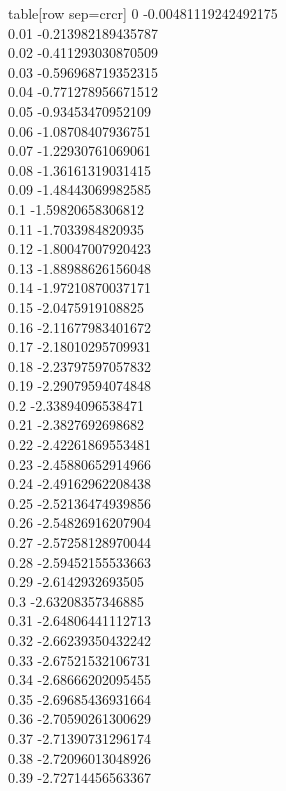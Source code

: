   table[row sep=crcr]{%
0	-0.00481119242492175\\
0.01	-0.213982189435787\\
0.02	-0.411293030870509\\
0.03	-0.596968719352315\\
0.04	-0.771278956671512\\
0.05	-0.93453470952109\\
0.06	-1.08708407936751\\
0.07	-1.22930761069061\\
0.08	-1.36161319031415\\
0.09	-1.48443069982585\\
0.1	-1.59820658306812\\
0.11	-1.7033984820935\\
0.12	-1.80047007920423\\
0.13	-1.88988626156048\\
0.14	-1.97210870037171\\
0.15	-2.0475919108825\\
0.16	-2.11677983401672\\
0.17	-2.18010295709931\\
0.18	-2.23797597057832\\
0.19	-2.29079594074848\\
0.2	-2.33894096538471\\
0.21	-2.3827692698682\\
0.22	-2.42261869553481\\
0.23	-2.45880652914966\\
0.24	-2.49162962208438\\
0.25	-2.52136474939856\\
0.26	-2.54826916207904\\
0.27	-2.57258128970044\\
0.28	-2.59452155533663\\
0.29	-2.6142932693505\\
0.3	-2.63208357346885\\
0.31	-2.64806441112713\\
0.32	-2.66239350432242\\
0.33	-2.67521532106731\\
0.34	-2.68666202095455\\
0.35	-2.69685436931664\\
0.36	-2.70590261300629\\
0.37	-2.71390731296174\\
0.38	-2.72096013048926\\
0.39	-2.72714456563367\\
}
